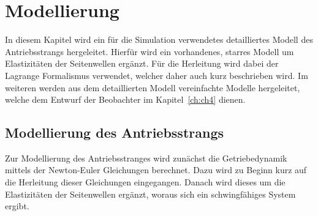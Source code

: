 \chapter{Modellierung}\label{ch:ch2}
In diesem Kapitel wird ein für die Simulation verwendetes detailliertes Modell des Antriebsstrangs hergeleitet. Hierfür wird ein vorhandenes, starres Modell um Elastizitäten der Seitenwellen ergänzt. Für die Herleitung wird dabei der Lagrange Formalismus verwendet, welcher daher auch kurz beschrieben wird. Im weiteren werden aus dem detaillierten Modell vereinfachte Modelle hergeleitet, welche dem Entwurf der Beobachter im Kapitel~\ref{ch:ch4} dienen.


\section{Modellierung des Antriebsstrangs}
Zur Modellierung des Antriebsstranges wird zunächst die Getriebedynamik mittels der Newton-Euler Gleichungen berechnet. Dazu wird zu Beginn kurz auf die Herleitung dieser Gleichungen eingegangen. Danach wird dieses um die Elastizitäten der Seitenwellen ergänzt, woraus sich ein schwingfähiges System ergibt.  


